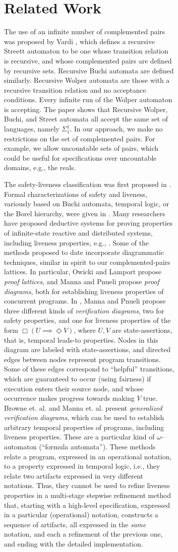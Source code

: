 \documentclass[11pt]{article}
\newcommand{\always}{\Box}
\newcommand{\eventually}{\Diamond}
\begin{document}
\begin{figure}[htb]
\begin{figure}[htb]
\section{Related Work}
\label{sec:related}

The use of an infinite number of complemented pairs was proposed by
Vardi \cite{Var91}, which defines a recursive Streett automaton to be
one whose transition relation is recursive, and whose complemented
pairs are defined by recursive sets. Recursive Buchi automata are
defined similarly. Recursive Wolper automata are those with a
recursive transition relation and no acceptance conditions. Every
infinite run of the Wolper automaton is accepting.
The paper shows that Recursive Wolper, Buchi, and Street
automata all accept the same set of languages, namely $\Sigma_1^1$.
In our approach, we make no restrictions on the set of complemented
pairs. For example, we allow uncountable sets of pairs, which could be
useful for specifications over uncountable domains, e.g., the reals.

The safety-liveness classification was first proposed in \cite{Lam77}.
Formal characterizations of safety and liveness, variously based on Buchi
automata, temporal logic, or the Borel hierarchy, 
were given in \cite{AS87,MP90,Sis94}. 
Many researchers have proposed deductive systems for proving
properties of infinite-state reactive and distributed systems, including liveness
properties, e.g., \cite{AS89,Lam94,Lam02,MP91}.
Some of the methods proposed to date incorporate diagrammatic
techniques, similar in spirit to our complemented-pairs
lattices. 
In particular, Owicki and Lamport \cite{OL82} propose \emph{proof lattices},
and Manna and Pnueli \cite{MP83,MP93} propose
\emph{proof diagrams}, both for establishing liveness properties of
concurrent programs. 
In \cite{MP94}, Manna and Pnueli propose three different kinds of 
\emph{verification diagrams}, two for safety properties, and one for
liveness properties of the form 
$\always(U \implies \eventually V)$, where $U,V$ are state-assertions,
that is, temporal leads-to properties. Nodes in this diagram are
labeled with state-assertions, and directed edges between nodes
represent program transitions. 
Some of these edges correspond to ``helpful'' transitions, which are
guaranteed to occur (using fairness) if execution enters their source
node, and whose occurrence makes progress towards making $V$ true.
Browne et. al. \cite{BMS95} and Manna et. al. \cite{MBSU98} present
\emph{generalized verification diagrams}, 
which can be used to establish arbitrary temporal properties of
programs, including liveness properties. These are a particular kind
of $\omega$-automaton (``formula automata'').
These methods relate a program, expressed in an operational notation,
to a property expressed in temporal logic, i.e., they relate two
artifacts expressed in very different notations.  Thus, they cannot be
used to refine liveness properties in a multi-stage stepwise
refinement method that, starting with a high-level specification,
expressed in a particular (operational) notation, 
constructs a sequence of artifacts, all expressed in the \emph{same} notation, 
and each a refinement of the previous one, and ending with the
detailed implementation.


\end{figure}
\end{figure}
\end{document}

